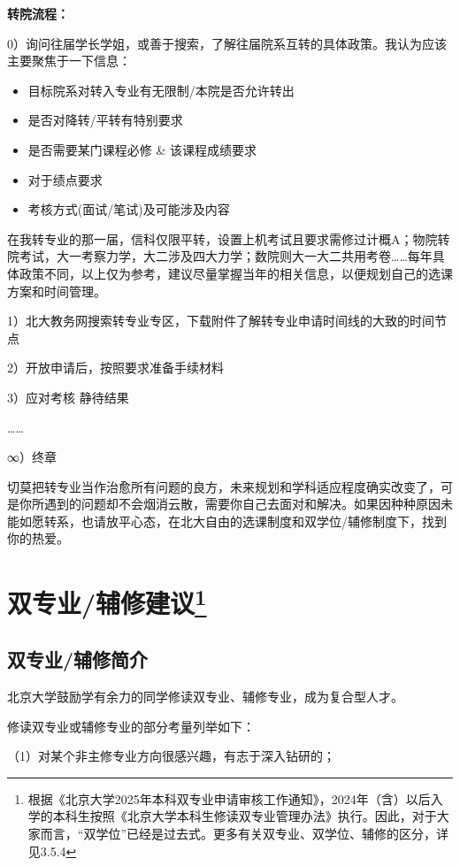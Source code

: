 \documentclass[11pt,oneside]{book}
\begin{document}
\textbf{\textbf{转院流程}}\textbf{\textbf{：}}

0）询问往届学长学姐，或善于搜索，了解往届院系互转的具体政策。我认为应该主要聚焦于一下信息：

\begin{itemize}
    \item 目标院系对转入专业有无限制/本院是否允许转出
    \item 是否对降转/平转有特别要求
    \item 是否需要某门课程必修 \& 该课程成绩要求
    \item 对于绩点要求
    \item 考核方式(面试/笔试)及可能涉及内容
\end{itemize}

在我转专业的那一届，信科仅限平转，设置上机考试且要求需修过计概A；物院转院考试，大一考察力学，大二涉及四大力学；数院则大一大二共用考卷……每年具体政策不同，以上仅为参考，建议尽量掌握当年的相关信息，以便规划自己的选课方案和时间管理。

1）北大教务网搜索转专业专区，下载附件了解转专业申请时间线的大致的时间节点

2）开放申请后，按照要求准备手续材料

3）应对考核 静待结果

……

∞）终章

切莫把转专业当作治愈所有问题的良方，未来规划和学科适应程度确实改变了，可是你所遇到的问题却不会烟消云散，需要你自己去面对和解决。如果因种种原因未能如愿转系，也请放平心态，在北大自由的选课制度和双学位/辅修制度下，找到你的热爱。

\newpage

\section[双专业/辅修建议]{双专业/辅修建议\footnote{根据《北京大学2025年本科双专业申请审核工作通知》，2024年（含）以后入学的本科生按照《北京大学本科生修读双专业管理办法》执行。因此，对于大家而言，“双学位”已经是过去式。更多有关双专业、双学位、辅修的区分，详见3.5.4}}
\subsection{双专业/辅修简介}
北京大学鼓励学有余力的同学修读双专业、辅修专业，成为复合型人才。

修读双专业或辅修专业的部分考量列举如下：

（1）对某个非主修专业方向很感兴趣，有志于深入钻研的；
\end{document}
